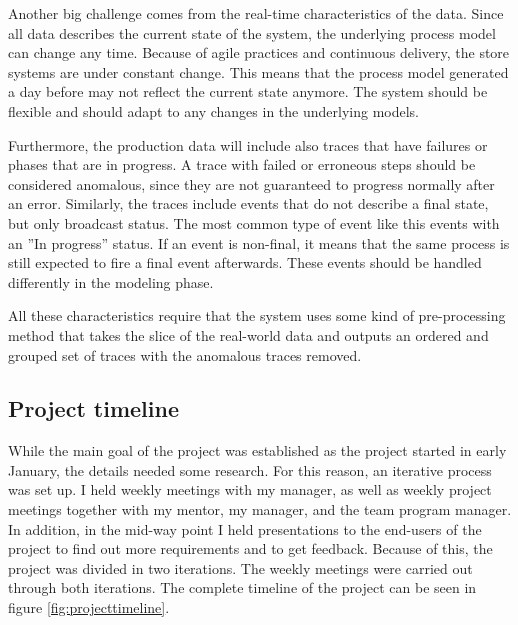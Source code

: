 Another big challenge comes from the real-time characteristics of the data. Since all data describes the current state of the system, the underlying process model can change any time. Because of agile practices and continuous delivery, the store systems are under constant change. This means that the process model generated a day before may not reflect the current state anymore. The system should be flexible and should adapt to any changes in the underlying models.

Furthermore, the production data will include also traces that have failures or phases that are in progress.
A trace with failed or erroneous steps should be considered anomalous, since they are not guaranteed to progress normally after an error. 
Similarly, the traces include events that do not describe a final state, but only broadcast status. 
The most common type of event like this events with an ''In progress'' status.
If an event is non-final, it means that the same process is still expected to fire a final event afterwards.
These events should be handled differently in the modeling phase.

All these characteristics require that the system uses some kind of pre-processing method that takes the slice of the real-world data and outputs an ordered and grouped set of traces with the anomalous traces removed.

\subsection{Project timeline}
\label{sec:timeline}
While the main goal of the project was established as the project started in early January,
the details needed some research. For this reason, an iterative process was set up.
I held weekly meetings with my manager, as well as weekly project meetings together with my mentor, my manager, and the team program manager. In addition, in the mid-way point I held presentations to the end-users of the project to find out more requirements and to get feedback. Because of this, the project was divided in two iterations.
The weekly meetings were carried out through both iterations.
The complete timeline of the project can be seen in figure \ref{fig:projecttimeline}.

